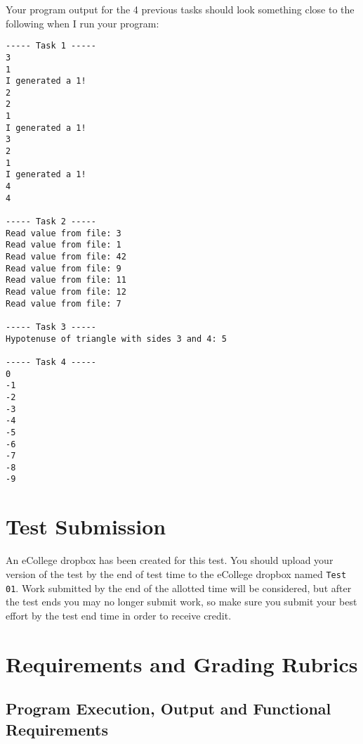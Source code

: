 \documentclass[11pt]{article}
\begin{document}
Your program output for the 4 previous tasks should look something
close to the following when I run your program:


\begin{verbatim}
----- Task 1 -----
3
1
I generated a 1!
2
2
1
I generated a 1!
3
2
1
I generated a 1!
4
4

----- Task 2 -----
Read value from file: 3
Read value from file: 1
Read value from file: 42
Read value from file: 9
Read value from file: 11
Read value from file: 12
Read value from file: 7

----- Task 3 -----
Hypotenuse of triangle with sides 3 and 4: 5

----- Task 4 -----
0
-1
-2
-3
-4
-5
-6
-7
-8
-9
\end{verbatim}
\section*{Test Submission}
\label{sec-3}


An eCollege dropbox has been created for this test.  You should upload
your version of the test by the end of test time to the eCollege
dropbox named \verb~Test 01~.  Work submitted by the end of the allotted
time will be considered, but after the test ends you may no longer
submit work, so make sure you submit your best effort by the test end
time in order to receive credit.
\section*{Requirements and Grading Rubrics}
\label{sec-4}
\subsection*{Program Execution, Output and Functional Requirements}
\label{sec-4-1}
\end{document}
